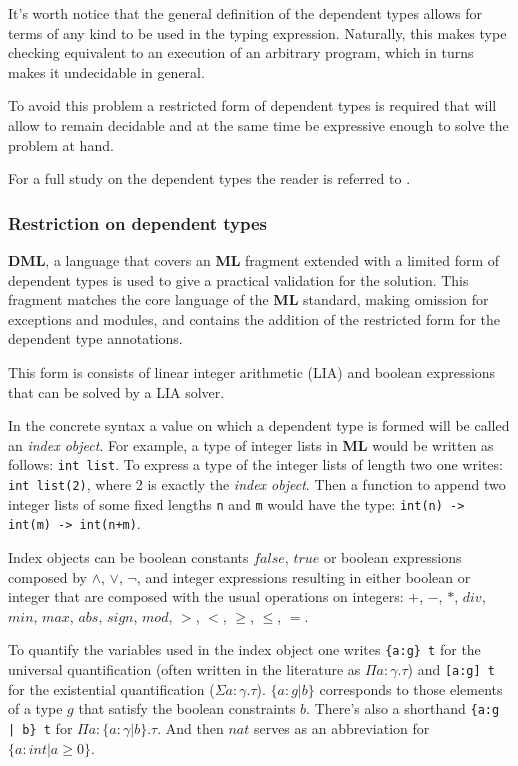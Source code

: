 \documentclass[a4paper,UKenglish]{lipics-v2016}
\begin{document}
It's worth notice that the general definition of the dependent types allows for
terms of any kind to be used in the typing expression. Naturally, this makes
type checking equivalent to an execution of an arbitrary program, which in
turns makes it undecidable in general.

To avoid this problem a restricted form of dependent types is required that
will allow to remain decidable and at the same time be expressive enough to
solve the problem at hand.

For a full study on the dependent types the reader is referred to
\cite{Hofmann97syntaxand}.

\subsubsection{Restriction on dependent types}

\textbf{DML}, a language that covers an \textbf{ML} fragment extended with a
limited form of dependent types is used to give a practical validation for the
solution. This fragment matches the core language of the \textbf{ML} standard,
making omission for exceptions and modules, and contains the addition of the
restricted form for the dependent type annotations.

This form is consists of linear integer arithmetic (LIA) and boolean
expressions that can be solved by a LIA solver.

In the concrete syntax a value on which a dependent type is formed will be
called an \emph{index object}. For example, a type of integer lists in
\textbf{ML} would be written as follows: \texttt{int list}. To express a type
of the integer lists of length two one writes: \texttt{int list(2)}, where 2 is
exactly the \emph{index object}. Then a function to append two integer lists of
some fixed lengths \texttt{n} and \texttt{m} would have the type:
\texttt{int(n) -> int(m) -> int(n+m)}.

Index objects can be boolean constants $false$, $true$ or boolean expressions
composed by $\land$, $\lor$, $\neg$, and integer expressions resulting in
either boolean or integer that are composed with the usual operations on
integers: $+$, $-$, $*$, $div$, $min$, $max$, $abs$, $sign$, $mod$, $>$, $<$,
$\ge$, $\le$, $=$.

To quantify the variables used in the index object one writes \texttt{\{a:g\}
t} for the universal quantification (often written in the literature as $\Pi a:
\gamma.  \tau$) and \texttt{[a:g] t} for the existential quantification
($\Sigma a: \gamma. \tau$).  $\{ a: g | b \}$ corresponds to those elements of
a type $g$ that satisfy the boolean constraints $b$. There's also a shorthand
\texttt{\{a:g | b\} t} for $\Pi a: \{a: \gamma | b\}. \tau$. And then $nat$
serves as an abbreviation for $\{ a: int | a \geq 0 \}$.
\end{document}

